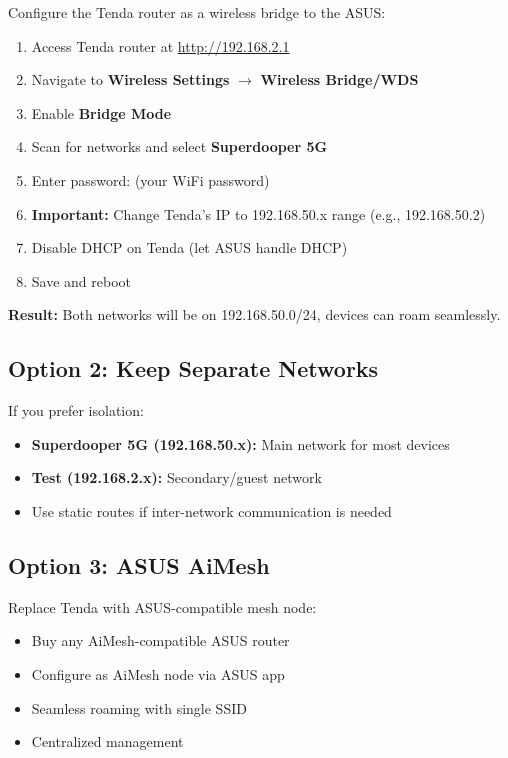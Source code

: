 \documentclass[11pt,letterpaper]{article}
\begin{document}
Configure the Tenda router as a wireless bridge to the ASUS:

\begin{enumerate}
    \item Access Tenda router at \url{http://192.168.2.1}
    \item Navigate to \textbf{Wireless Settings} $\rightarrow$ \textbf{Wireless Bridge/WDS}
    \item Enable \textbf{Bridge Mode}
    \item Scan for networks and select \textbf{Superdooper 5G}
    \item Enter password: (your WiFi password)
    \item \textbf{Important:} Change Tenda's IP to 192.168.50.x range (e.g., 192.168.50.2)
    \item Disable DHCP on Tenda (let ASUS handle DHCP)
    \item Save and reboot
\end{enumerate}

\textbf{Result:} Both networks will be on 192.168.50.0/24, devices can roam seamlessly.

\subsection{Option 2: Keep Separate Networks}

If you prefer isolation:

\begin{itemize}
    \item \textbf{Superdooper 5G (192.168.50.x):} Main network for most devices
    \item \textbf{Test (192.168.2.x):} Secondary/guest network
    \item Use static routes if inter-network communication is needed
\end{itemize}

\subsection{Option 3: ASUS AiMesh}

Replace Tenda with ASUS-compatible mesh node:

\begin{itemize}
    \item Buy any AiMesh-compatible ASUS router
    \item Configure as AiMesh node via ASUS app
    \item Seamless roaming with single SSID
    \item Centralized management
\end{itemize}
\end{document}
